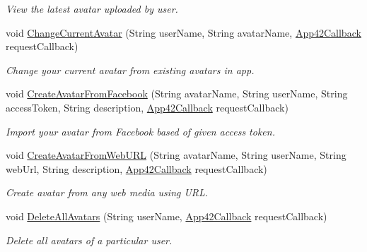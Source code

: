 \begin{DoxyCompactItemize}
\begin{DoxyCompactList}\small\item\em View the latest avatar uploaded by user. \end{DoxyCompactList}\item 
void \hyperlink{classcom_1_1shephertz_1_1app42_1_1paas_1_1sdk_1_1windows_1_1avatar_1_1_avatar_service_a13edefc80d5bd973425869de14dace3c}{Change\+Current\+Avatar} (String user\+Name, String avatar\+Name, \hyperlink{interfacecom_1_1shephertz_1_1app42_1_1paas_1_1sdk_1_1windows_1_1_app42_callback}{App42\+Callback} request\+Callback)
\begin{DoxyCompactList}\small\item\em Change your current avatar from existing avatars in app. \end{DoxyCompactList}\item 
void \hyperlink{classcom_1_1shephertz_1_1app42_1_1paas_1_1sdk_1_1windows_1_1avatar_1_1_avatar_service_a852fa767397714fe2f4ad2574bbe64da}{Create\+Avatar\+From\+Facebook} (String avatar\+Name, String user\+Name, String access\+Token, String description, \hyperlink{interfacecom_1_1shephertz_1_1app42_1_1paas_1_1sdk_1_1windows_1_1_app42_callback}{App42\+Callback} request\+Callback)
\begin{DoxyCompactList}\small\item\em Import your avatar from Facebook based of given access token. \end{DoxyCompactList}\item 
void \hyperlink{classcom_1_1shephertz_1_1app42_1_1paas_1_1sdk_1_1windows_1_1avatar_1_1_avatar_service_a89d67011e0e6b3d332bf5fbe7fbe1aaf}{Create\+Avatar\+From\+Web\+U\+R\+L} (String avatar\+Name, String user\+Name, String web\+Url, String description, \hyperlink{interfacecom_1_1shephertz_1_1app42_1_1paas_1_1sdk_1_1windows_1_1_app42_callback}{App42\+Callback} request\+Callback)
\begin{DoxyCompactList}\small\item\em Create avatar from any web media using U\+R\+L. \end{DoxyCompactList}\item 
void \hyperlink{classcom_1_1shephertz_1_1app42_1_1paas_1_1sdk_1_1windows_1_1avatar_1_1_avatar_service_ae9c60c9a7156a5cc20f29c7fa5ccc08c}{Delete\+All\+Avatars} (String user\+Name, \hyperlink{interfacecom_1_1shephertz_1_1app42_1_1paas_1_1sdk_1_1windows_1_1_app42_callback}{App42\+Callback} request\+Callback)
\begin{DoxyCompactList}\small\item\em Delete all avatars of a particular user. \end{DoxyCompactList}\item 

\end{DoxyCompactItemize}
